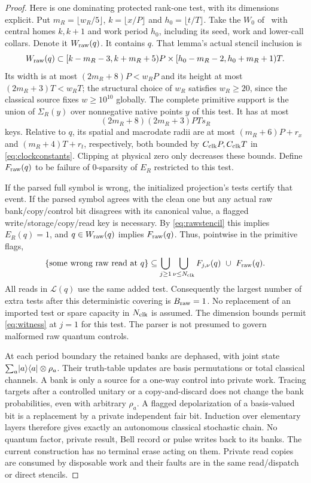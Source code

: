 \begin{proof}
Here is one dominating protected rank-one test, with its dimensions explicit. Put $m_R=\lfloor w_R/5\rfloor$, $k=\lfloor x/P\rfloor$ and $h_0=\lfloor t/T\rfloor$. Take the $W_0$ of~\cite[Lemma~5.24]{DMNoise1D2026} with central homes $k,k+1$ and work period $h_0$, including its seed, work and lower-call collars. Denote it $W_{\rm raw}(q)$. It contains $q$. That lemma's actual stencil inclusion is
\[
 W_{\rm raw}(q)\subset
 [k-m_R-3,k+m_R+5)P
 \times[h_0-m_R-2,h_0+m_R+1)T.
\]
Its width is at most $(2m_R+8)P<w_RP$ and its height at most $(2m_R+3)T<w_RT$; the structural choice of $w_R$ satisfies $w_R\ge20$, since the classical source fixes $w\ge10^{10}$ globally. The complete primitive support is the union of $\Sigma_R(y)$ over nonnegative native points $y$ of this test. It has at most
\[
 (2m_R+8)(2m_R+3)PTs_R
\]
keys. Relative to $q$, its spatial and macrodate radii are at most $(m_R+6)P+r_x$ and $(m_R+4)T+r_t$, respectively, both bounded by $C_{\rm clk}P,C_{\rm clk}T$ in \eqref{eq:clockconstants}. Clipping at physical zero only decreases these bounds. Define $F_{\rm raw}(q)$ to be failure of $0$-sparsity of $E_R$ restricted to this test.

If the parsed full symbol is wrong, the initialized projection's tests certify that event. If the parsed symbol agrees with the clean one but any actual raw bank/copy/control bit disagrees with its canonical value, a flagged write/storage/copy/read key is necessary. By \eqref{eq:rawstencil} this implies $E_R(q)=1$, and $q\in W_{\rm raw}(q)$ implies $F_{\rm raw}(q)$. Thus, pointwise in the primitive flags,
\begin{equation}\label{eq:rawcover}
 \{\text{some wrong raw read at }q\}
 \subseteq
 \bigcup_{j\ge1}\bigcup_{\nu\le N_{\rm clk}}F_{j,\nu}(q)
 \ \cup\ F_{\rm raw}(q).
\end{equation}
All reads in $\mathcal L(q)$ use the same added test. Consequently the largest number of extra tests after this deterministic covering is $B_{\rm raw}=1$. No replacement of an imported test or spare capacity in $N_{\rm clk}$ is assumed. The dimension bounds permit \eqref{eq:witness} at $j=1$ for this test. The parser is not presumed to govern malformed raw quantum controls.

At each period boundary the retained banks are dephased, with joint state $\sum_a\lvert a\rangle\langle a\rvert\otimes\rho_a$. Their truth-table updates are basis permutations or total classical channels. A bank is only a source for a one-way control into private work. Tracing targets after a controlled unitary or a copy-and-discard does not change the bank probabilities, even with arbitrary $\rho_a$. A flagged depolarization of a basis-valued bit is a replacement by a private independent fair bit. Induction over elementary layers therefore gives exactly an autonomous classical stochastic chain. No quantum factor, private result, Bell record or pulse writes back to its banks. The current construction has no terminal erase acting on them. Private read copies are consumed by disposable work and their faults are in the same read/dispatch or direct stencils.


\end{proof}
